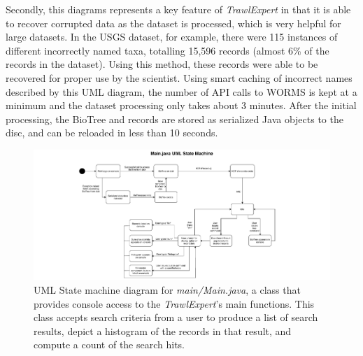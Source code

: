 \documentclass{article}
\begin{document}
Secondly, this diagrams represents a key feature of \textit{TrawlExpert} in that it is able to recover corrupted data as the dataset is processed, which is very helpful for large datasets. In the USGS dataset, for example, there were 115 instances of different incorrectly named taxa, totalling 15,596 records (almost 6\% of the records in the dataset). Using this method, these records were able to be recovered for proper use by the scientist. Using smart caching of incorrect names described by this UML diagram, the number of API calls to WORMS is kept at a minimum and the dataset processing only takes about 3 minutes. After the initial processing, the BioTree and records are stored as serialized Java objects to the disc, and can be reloaded in less than 10 seconds.


\begin{figure}[H]
\includegraphics[width=18cm, trim={6cm 0 6cm 0}, clip]{MainDotJava.pdf}

\caption{UML State machine diagram for \textit{main/Main.java}, a class that provides console access to the \textit{TrawlExpert}'s main functions. This class accepts search criteria from a user to produce a list of search results, depict a histogram of the records in that result, and compute a count of the search hits.}
\label{fig:MainUML}
\end{figure}
\end{document}
